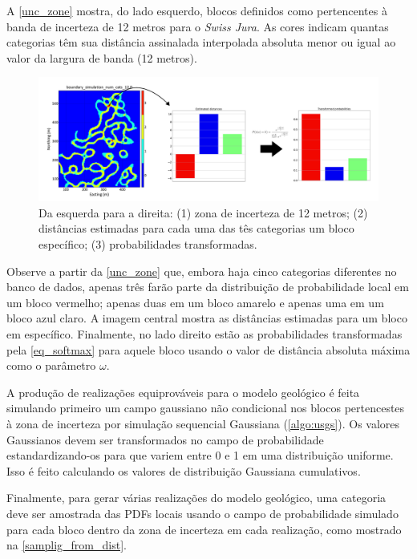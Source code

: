 A \autoref{unc_zone} mostra, do lado esquerdo, blocos definidos como pertencentes à banda de incerteza de 12 metros para o \textit{Swiss Jura}. As cores indicam quantas categorias têm sua distância assinalada interpolada absoluta menor ou igual ao valor da largura de banda (12 metros).

\begin{figure}[H]
	\caption{\label{unc_zone} Da esquerda para a direita: (1) zona de incerteza de 12 metros; (2) distâncias estimadas para cada uma das tês categorias um bloco específico; (3) probabilidades transformadas.}
	\centering
		\includegraphics[width=\textwidth]{capitulo_3/imagens/trans_dist_prob.png}
\end{figure}

Observe a partir da \autoref{unc_zone} que, embora haja cinco categorias diferentes no banco de dados, apenas três farão parte da distribuição de probabilidade local em um bloco vermelho; apenas duas em um bloco amarelo e apenas uma em um bloco azul claro. A imagem central mostra as distâncias estimadas para um bloco em específico. Finalmente, no lado direito estão as probabilidades transformadas pela \autoref{eq_softmax} para aquele bloco usando o valor de distância absoluta máxima como o parâmetro $\omega$.

A produção de realizações equiprováveis para o modelo geológico é feita simulando primeiro um campo gaussiano não condicional nos blocos pertencestes à zona de incerteza por simulação sequencial Gaussiana (\autoref{algo:usgs}). Os valores Gaussianos devem ser transformados no campo de probabilidade estandardizando-os para que variem entre 0 e 1 em uma distribuição uniforme. Isso é feito calculando os valores de distribuição Gaussiana cumulativos.

Finalmente, para gerar várias realizações do modelo geológico, uma categoria deve ser amostrada das PDFs locais usando o campo de probabilidade simulado para cada bloco dentro da zona de incerteza em cada realização, como mostrado na \autoref{samplig_from_dist}.


